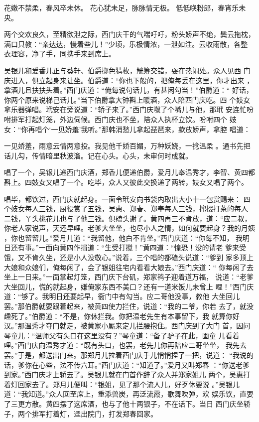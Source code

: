 花嫩不禁柔，春风卒未休。
花心犹未足，脉脉情无极。
低低唤粉郎，春宵乐未央。

两个交欢良久，至精欲泄之际，西门庆干的气喘吁吁，粉头娇声不绝，鬓云拖枕，
满口只教：“亲达达，慢着些儿！”少顷，乐极情浓，一泄如注。云收雨散，各整
衣理容，净了手，同携手来到席上。

吴银儿和爱香儿正与葵轩、伯爵掷色猜枚，觥筹交错，耍在热闹处。众人见西
门庆进入，俱立起身来让坐。伯爵道：“你也下般的，把俺每丢在这里，你才出来
，拿酒儿且扶扶头着。”西门庆道：“俺每说句话儿，有甚闲勾当！”伯爵道：“
好话，你两个原来说梯己话儿。”当下伯爵拿大钟斟上暖酒，众人陪西门庆吃。四
个妓女拿乐器弹唱。玳安在旁说道：“轿子来了。”西门庆呶了个嘴儿与他，那玳
安连忙吩咐排军打起灯笼，外边伺候。西门庆也不坐，陪众人执杯立饮。吩咐四个
妓女：“你再唱个‘一见娇羞’我听。”那韩消愁儿拿起琵琶来，款放娇声，拿腔
唱道：

一见娇羞，雨意云情两意投。我见他千娇百媚，万种妖娆，一捻温柔
。通书先把话儿勾，传情暗里秋波溜。记在心头。心头，未审何时成就。

唱了一个，吴银儿递西门庆酒，郑香儿便递伯爵，爱月儿奉温秀才，李智、黄四都
斟上。四妓女又唱了一个。吃毕，众人又彼此交换递了两转，妓女又唱了两个。

唱毕，都饮过，西门庆就起身。一面令玳安向书袋内取出大小十一包赏赐来：
四个妓女每人三钱，厨役赏了五钱，吴惠、郑春、郑奉每人三钱，撺掇打茶的每人
二钱，丫头桃花儿也与了他三钱。俱磕头谢了。黄四再三不肯放，道：“应二叔，
你老人家说声，天还早哩。老爹大坐坐，也尽小人之情，如何就要起身？我的月姨
，你也留留儿。”爱月儿道：“我留他，他白不肯坐。”西门庆道：“你每不知，
我明日还有事。”一面向黄四作揖道：“生受打搅！”黄四道：“惶恐！没的请老
爹来受饿，又不肯久坐，还是小人没敬心。”说着，三个唱的都磕头说道：“爹到
家多顶上大娘和众娘们，俺每闲了，会了银姐往宅内看看大娘去。”西门庆道：“
你每闲了去坐上一日来。”一面掌起灯笼，西门庆下台矶，郑家鸨子迎着道万福，
说道：“老爹大坐回儿，慌的就起身，嫌俺家东西不美口？还有一道米饭儿未曾上
哩！”西门庆道：“够了。我明日还要起早，衙门中有勾当。应二哥他没事，教他
大坐回儿罢。”那伯爵就要跟着起来，被黄四使力拦住，说道：“我的二爷，你若
去了，就没趣死了。”伯爵道：“不是，你休拦我。你把温老先生有本事留下，我
就算你好汉。”那温秀才夺门就走，被黄家小厮来定儿拦腰抱住。西门庆到了大门
首，因问琴童儿：“温师父有头口在这里没有？”琴童道：“备了驴子在此，画童
儿看着哩。”西门庆向温秀才道：“既有头口，也罢，老先儿你再陪应二哥坐坐，
我先去罢。”于是，都送出门来。那郑月儿拉着西门庆手儿悄悄捏了一把，说道：
“我说的话，爹你在心些，法不传六耳。”西门庆道：“知道了。”爱月又叫郑春
：“你送老爹到家。”西门庆才上轿去了。吴银儿就在门首作辞了众人并郑家姐儿
两个，吴惠打着灯回家去了。郑月儿便叫：“银姐，见了那个流人儿，好歹休要说
。”吴银儿道：“我知道。”众人回至席上，重添兽炭，再泛流霞，歌舞吹弹，欢
娱乐饮，直耍了三更方散。黄四摆了这席酒，也与了他十两银子，不在话下。当日
西门庆坐轿子，两个排军打着灯，迳出院门，打发郑春回家。

